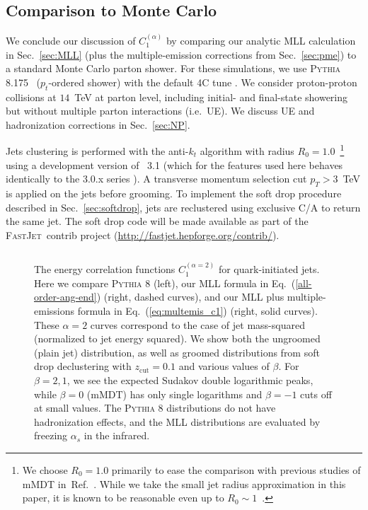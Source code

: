 \documentclass[letterpaper,11pt]{article}
\newcommand{\C}[2]{C^{(#2)}_{#1}}
\newcommand{\zcut}{z_\text{cut}}
\newcommand{\ea}{{\C{1}{\alpha}}}
\DeclareRobustCommand{\Sec}[1]{Sec.~\ref{#1}}
\DeclareRobustCommand{\Eq}[1]{Eq.~(\ref{#1})}
\DeclareRobustCommand{\Ref}[1]{Ref.~\cite{#1}}
\newcommand{\pythia}[1]{\textsc{Pythia\xspace #1}}
\newcommand{\fastjet}[1]{\textsc{FastJet\xspace #1}}
\begin{document}
\subsection{Comparison to Monte Carlo}
\label{sec:ang-MC}

We conclude our discussion of $\ea$ by comparing our analytic MLL calculation in \Sec{sec:MLL} (plus the multiple-emission corrections from \Sec{sec:pme}) to a standard Monte Carlo parton shower.  For these simulations, we use \pythia{8.175}~\cite{pythia8} ($p_t$-ordered shower) with the default 4C tune \cite{Corke:2010yf}. We consider proton-proton collisions at $14$~TeV at parton level, including initial- and final-state showering but without multiple parton interactions (i.e.\ UE).  We discuss UE and hadronization corrections in \Sec{sec:NP}.

Jets clustering is performed with the anti-$k_t$ algorithm \cite{anti-kt} with radius $R_0=1.0$~\footnote{We choose $R_0=1.0$ primarily to ease the comparison with previous studies of mMDT in~\Ref{taggersRES}. While we take the small jet radius approximation in this paper, it is known to be reasonable even up to $R_0\sim1$~\cite{Dasgupta:2007wa,DKMS}.} using a development version of \fastjet~3.1 (which for the features used here behaves identically to the 3.0.x series \cite{fastjet}). 
A transverse momentum selection cut $p_T>3$~TeV is applied on the jets before grooming.  To implement the soft drop procedure described in \Sec{sec:softdrop}, jets are reclustered using exclusive C/A \cite{Wobisch:1998wt,Dokshitzer:1997in} to return the same jet.  The soft drop code will be made available as part of the \fastjet\ contrib project (\url{http://fastjet.hepforge.org/contrib/}).



\begin{figure}[]
\begin{center}
$\quad$
\end{center}
\caption{
The energy correlation functions $C_1^{(\alpha=2)}$ for quark-initiated jets.  Here we compare \pythia{8} \cite{pythia8} (left), our MLL formula in \Eq{all-order-ang-end} (right, dashed curves), and our MLL plus multiple-emissions formula in \Eq{eq:multemis_c1} (right, solid curves).  These $\alpha = 2$ curves correspond to the case of jet mass-squared (normalized to jet energy squared).  We show both the ungroomed (plain jet) distribution, as well as groomed distributions from soft drop declustering with $\zcut = 0.1$ and various values of $\beta$.  For $\beta = 2,1$, we see the expected Sudakov double logarithmic peaks, while $\beta = 0$ (mMDT) has only single logarithms and $\beta = -1$ cuts off at small values.  The \pythia{8} distributions do not have hadronization effects, and the MLL distributions are evaluated by freezing $\alpha_s$ in the infrared.
}
\label{fig:sd_mass}
\end{figure}
\end{document}
